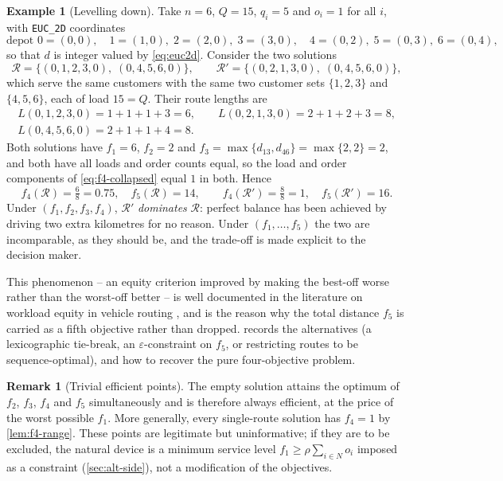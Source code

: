 \documentclass[11pt,a4paper]{article}
\theoremstyle{definition}
\newtheorem{example}[definition]{Example}
\newtheorem{remark}[definition]{Remark}
\theoremstyle{plain}
\newcommand{\Routes}{\mathcal{R}}
\newcommand{\Cust}{N}
\begin{document}
\begin{example}[Levelling down]
\label{ex:degeneracy}
Take $n = 6$, $Q = 15$, $q_i = 5$ and $o_i = 1$ for all $i$, with
\texttt{EUC\_2D} coordinates
\[
  \text{depot } 0 = (0,0), \quad
  1 = (1,0),\; 2 = (2,0),\; 3 = (3,0), \quad
  4 = (0,2),\; 5 = (0,3),\; 6 = (0,4),
\]
so that $d$ is integer valued by \eqref{eq:euc2d}.  Consider the two solutions
\[
  \Routes = \bigl\{ (0,1,2,3,0),\; (0,4,5,6,0) \bigr\},
  \qquad
  \Routes' = \bigl\{ (0,2,1,3,0),\; (0,4,5,6,0) \bigr\},
\]
which serve the same customers with the same two customer sets
$\{1,2,3\}$ and $\{4,5,6\}$, each of load $15 = Q$.  Their route lengths are
\begin{gather*}
  L(0,1,2,3,0) = 1+1+1+3 = 6, \qquad
  L(0,2,1,3,0) = 2+1+2+3 = 8, \\
  L(0,4,5,6,0) = 2+1+1+4 = 8 .
\end{gather*}
Both solutions have $f_1 = 6$, $f_2 = 2$ and $f_3 = \max\{d_{13}, d_{46}\} =
\max\{2,2\} = 2$, and both have all loads and order counts equal, so the load
and order components of \eqref{eq:f4-collapsed} equal $1$ in both.  Hence
\[
  f_4(\Routes) = \tfrac{6}{8} = 0.75, \quad f_5(\Routes) = 14,
  \qquad
  f_4(\Routes') = \tfrac{8}{8} = 1, \quad f_5(\Routes') = 16 .
\]
Under $(f_1,f_2,f_3,f_4)$, $\Routes'$ \emph{dominates} $\Routes$: perfect
balance has been achieved by driving two extra kilometres for no reason.  Under
$(f_1,\dots,f_5)$ the two are incomparable, as they should be, and the
trade-off is made explicit to the decision maker.
\end{example}

This phenomenon -- an equity criterion improved by making the best-off worse
rather than the worst-off better -- is well documented in the literature on
workload equity in vehicle routing \cite{Matl2018}, and is the reason why the
total distance $f_5$ is carried as a fifth objective rather than dropped.
 records the alternatives (a lexicographic tie-break, an
$\varepsilon$-constraint on $f_5$, or restricting routes to be
sequence-optimal), and how to recover the pure four-objective problem.

\begin{remark}[Trivial efficient points]
\label{rem:trivial}
The empty solution attains the optimum of $f_2$, $f_3$, $f_4$ and $f_5$
simultaneously and is therefore always efficient, at the price of the worst
possible $f_1$.  More generally, every single-route solution has
$f_4 = 1$ by \cref{lem:f4-range}.  These points are legitimate but
uninformative; if they are to be excluded, the natural device is a minimum
service level $f_1 \ge \rho \sum_{i\in\Cust} o_i$ imposed as a constraint
(\cref{sec:alt-side}), not a modification of the objectives.
\end{remark}
\end{document}
